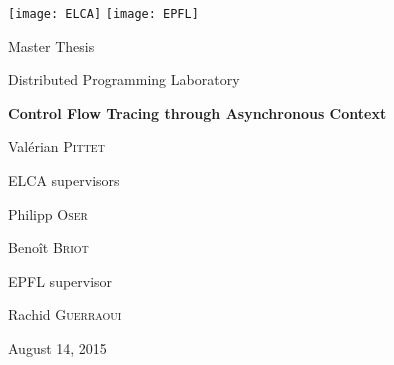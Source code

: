 \begin{titlepage}

  \newcommand{\rightside}[1]{
    \begin{flushright}
      \begin{minipage}[t]{0.48\textwidth}
        #1
      \end{minipage}
    \end{flushright}
  }


  \begin{center}
    \texttt{[image: ELCA]}
    \hfill
    \texttt{[image: EPFL]} \\[2cm]


    \rightside{
      \Large
      Master Thesis
      
      \small
      Distributed Programming Laboratory
    }


    \HRule
    \vspace{\baselineskip}

    \huge
    \textbf{\linespread{0}Control Flow Tracing through Asynchronous Context}
    \Large
    \HRule
    
    \rightside{
      \Large
      Val\'erian \textsc{Pittet}

      \vspace{2\baselineskip}

      \normalsize
      ELCA supervisors
      \smallskip
      \large
      \begin{list}{ }{}
      \item Philipp \textsc{Oser}
      \item Beno\^it \textsc{Briot}
      \end{list}
      
      \vspace{\baselineskip}

      \normalsize
      EPFL supervisor
      \smallskip
      \large
      \begin{list}{ }{}
      \item Rachid \textsc{Guerraoui}
      \end{list}


    }

    \vfill

    \normalsize
    August 14, 2015

  \end{center}

\end{titlepage}